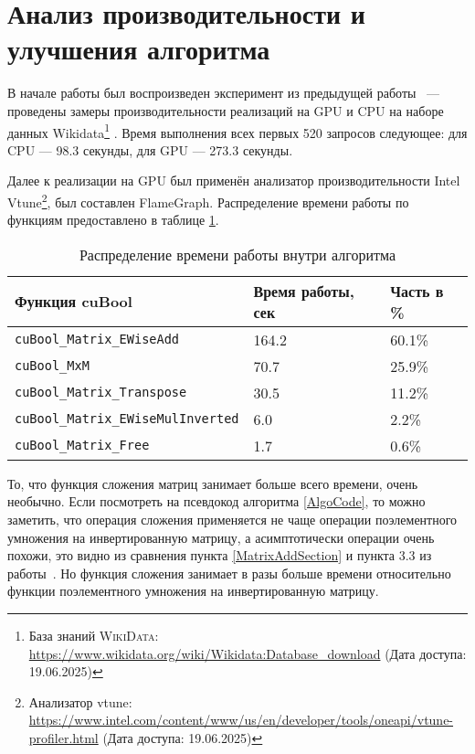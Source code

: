
\section{Анализ производительности и улучшения алгоритма}

В начале работы был воспроизведен эксперимент из предыдущей работы~\cite{PrevWork} --- проведены замеры производительности реализаций на GPU и CPU на наборе данных Wikidata\footnote{База знаний \textsc{WikiData}: \href{https://www.wikidata.org/wiki/Wikidata:Database_download}{https://www.wikidata.org/wiki/Wikidata:Database\_download} (Дата доступа: 19.06.2025)} \cite{wikidata}. Время выполнения всех первых 520 запросов следующее: для CPU --- 98.3 секунды, для GPU --- 273.3 секунды.

Далее к реализации на GPU был применён анализатор производительности Intel Vtune\footnote{Анализатор vtune: \url{https://www.intel.com/content/www/us/en/developer/tools/oneapi/vtune-profiler.html} (Дата доступа: 19.06.2025)}, был составлен FlameGraph. Распределение времени работы по функциям предоставлено в таблице \ref{tab:FlameGraph1}.      

\begin{table}[ht]
\centering
\caption{Распределение времени работы внутри алгоритма}
\label{tab:FlameGraph1}
\begin{tabular}{|l|l|l|}
\hline
Функция cuBool & Время работы, сек & Часть в \% \\
\hline
\verb|cuBool_Matrix_EWiseAdd| & 164.2 & 60.1\% \\
\verb|cuBool_MxM| & 70.7 & 25.9\% \\
\verb|cuBool_Matrix_Transpose| & 30.5 & 11.2\% \\
\verb|cuBool_Matrix_EWiseMulInverted| & 6.0 & 2.2\% \\
\verb|cuBool_Matrix_Free| & 1.7 & 0.6\% \\
\hline
\end{tabular}
\end{table}

То, что функция сложения матриц занимает больше всего времени, очень необычно. Если посмотреть на псевдокод алгоритма \ref{AlgoCode}, то можно заметить, что операция сложения применяется не чаще операции поэлементного умножения на инвертированную матрицу, а асимптотически операции очень похожи, это видно из сравнения пункта \ref{MatrixAddSection} и пункта 3.3 из работы~\cite{PrevWork}. Но функция сложения занимает в разы больше времени относительно функции поэлементного умножения на инвертированную матрицу.

